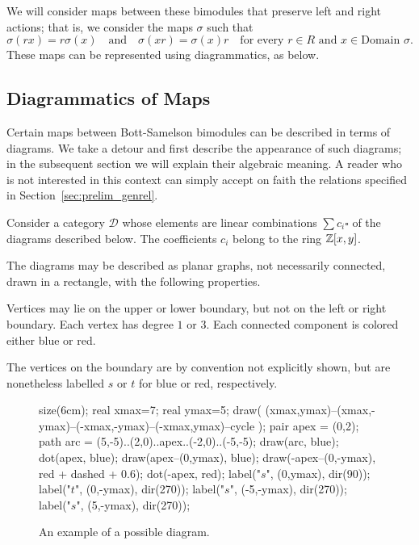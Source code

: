 We will consider maps between these bimodules that preserve left and right actions; that is, we consider the maps $\sigma$ such that
\begin{equation}
	\sigma(rx) = r\sigma(x) \quad\text{and}\quad \sigma(xr) = \sigma(x)r \quad\text{for every $r \in R$ and $x \in \text{Domain } \sigma$}.
	\label{eq:respect}
\end{equation}
These maps can be represented using diagrammatics, as below.

\subsection{Diagrammatics of Maps}
\label{sec:prelim_map}
\newcommand{\DD}{\mathcal D}
Certain maps between Bott-Samelson bimodules can be described in terms of diagrams.  We take a detour and first describe the appearance of such diagrams; in the subsequent section we will explain their algebraic meaning.  A reader who is not interested in this context can simply accept on faith the relations specified in Section~\ref{sec:prelim_genrel}.

Consider a category $\DD$ whose elements are linear combinations $\sum c_i \square$ of the diagrams described below.  The coefficients $c_i$ belong to the ring $\mathbb Z[x,y]$.

The diagrams may be described as planar graphs, not necessarily connected, drawn in a rectangle, with the following properties.
\begin{enumerate}[(i)]
	\ii Vertices may lie on the upper or lower boundary, but not on the left or right boundary.
	\ii Each vertex has degree $1$ or $3$.
	\ii Each connected component is colored either blue or red.
\end{enumerate}
The vertices on the boundary are by convention not explicitly shown, but are nonetheless labelled $s$ or $t$ for blue or red, respectively.

\begin{figure}[ht]
	\centering
	\begin{asy}
	size(6cm);
	real xmax=7;
	real ymax=5;
	draw( (xmax,ymax)--(xmax,-ymax)--(-xmax,-ymax)--(-xmax,ymax)--cycle );
	pair apex = (0,2);
	path arc = (5,-5)..(2,0)..apex..(-2,0)..(-5,-5);
	draw(arc, blue);
	dot(apex, blue);
	draw(apex--(0,ymax), blue);
	draw(-apex--(0,-ymax), red + dashed + 0.6);
	dot(-apex, red);
	label("$s$", (0,ymax), dir(90));
	label("$t$", (0,-ymax), dir(270));
	label("$s$", (-5,-ymax), dir(270));
	label("$s$", (5,-ymax), dir(270));
	\end{asy}
	\caption{An example of a possible diagram.}
	\label{fig:example_diagram}
\end{figure}

